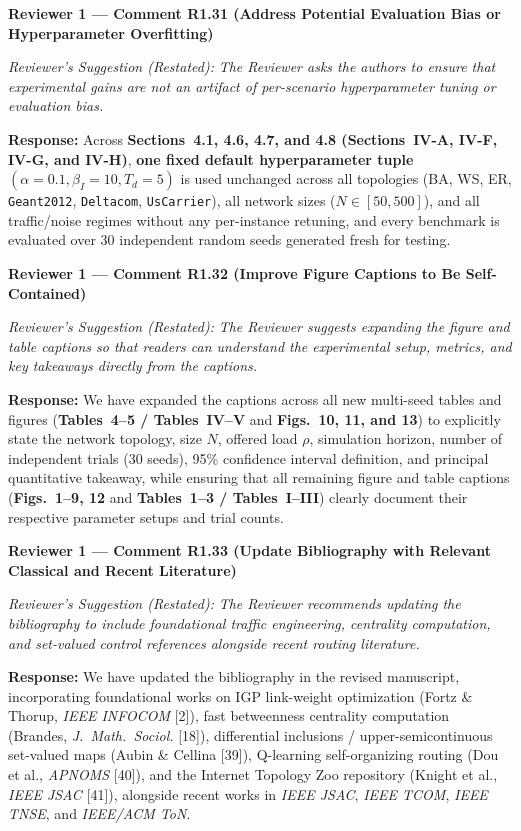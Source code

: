 \documentclass[11pt,a4paper]{article}
\newcommand{\cbox}[2]{%
  \vspace{0.6em}\noindent\textbf{#1}\par\smallskip
  \noindent\textit{Reviewer's Suggestion (Restated):} \textit{#2}\par\smallskip
}
\begin{document}
\hrulefill

\cbox{Reviewer 1 --- Comment R1.31 (Address Potential Evaluation Bias or Hyperparameter Overfitting)}{The Reviewer asks the authors to ensure that experimental gains are not an artifact of per-scenario hyperparameter tuning or evaluation bias.}

\noindent\textbf{Response:} Across \textbf{Sections~4.1, 4.6, 4.7, and 4.8 (Sections~IV-A, IV-F, IV-G, and IV-H)}, \textbf{one fixed default hyperparameter tuple $(\alpha = 0.1, \beta_I = 10, T_d = 5)$} is used unchanged across all topologies (BA, WS, ER, \texttt{Geant2012}, \texttt{Deltacom}, \texttt{UsCarrier}), all network sizes ($N \in [50, 500]$), and all traffic/noise regimes without any per-instance retuning, and every benchmark is evaluated over 30 independent random seeds generated fresh for testing.

\hrulefill

\cbox{Reviewer 1 --- Comment R1.32 (Improve Figure Captions to Be Self-Contained)}{The Reviewer suggests expanding the figure and table captions so that readers can understand the experimental setup, metrics, and key takeaways directly from the captions.}

\noindent\textbf{Response:} We have expanded the captions across all new multi-seed tables and figures (\textbf{Tables~4--5 / Tables~IV--V} and \textbf{Figs.~10, 11, and 13}) to explicitly state the network topology, size $N$, offered load $\rho$, simulation horizon, number of independent trials (30 seeds), 95\% confidence interval definition, and principal quantitative takeaway, while ensuring that all remaining figure and table captions (\textbf{Figs.~1--9, 12} and \textbf{Tables~1--3 / Tables~I--III}) clearly document their respective parameter setups and trial counts.

\hrulefill

\cbox{Reviewer 1 --- Comment R1.33 (Update Bibliography with Relevant Classical and Recent Literature)}{The Reviewer recommends updating the bibliography to include foundational traffic engineering, centrality computation, and set-valued control references alongside recent routing literature.}

\noindent\textbf{Response:} We have updated the bibliography in the revised manuscript, incorporating foundational works on IGP link-weight optimization (Fortz \& Thorup, \textit{IEEE INFOCOM} [2]), fast betweenness centrality computation (Brandes, \textit{J.\ Math.\ Sociol.} [18]), differential inclusions / upper-semicontinuous set-valued maps (Aubin \& Cellina [39]), Q-learning self-organizing routing (Dou et al., \textit{APNOMS} [40]), and the Internet Topology Zoo repository (Knight et al., \textit{IEEE JSAC} [41]), alongside recent works in \textit{IEEE JSAC}, \textit{IEEE TCOM}, \textit{IEEE TNSE}, and \textit{IEEE/ACM ToN}.
\end{document}
